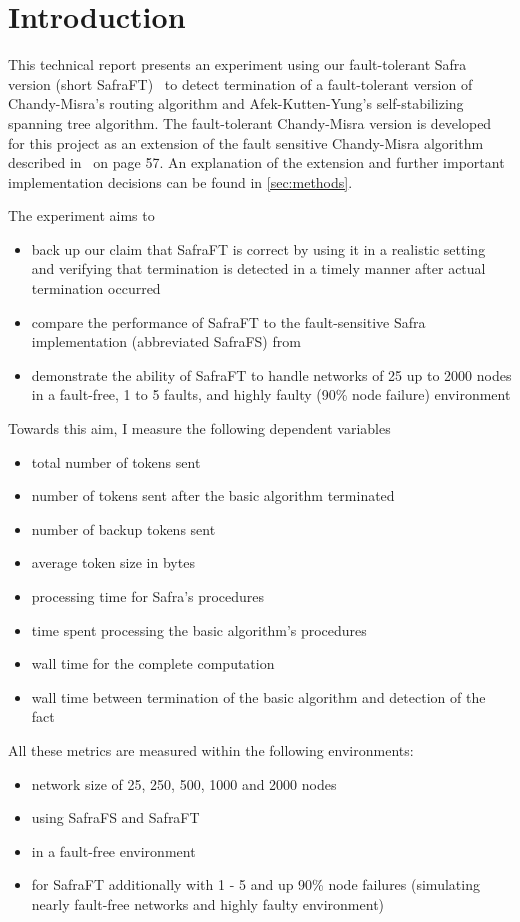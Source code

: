 \section{Introduction}
This technical report presents an experiment using our fault-tolerant Safra version (short SafraFT)~\cite{safraFT2018}
to detect termination of a fault-tolerant version of Chandy-Misra's routing algorithm and Afek-Kutten-Yung's self-stabilizing spanning tree algorithm.
The fault-tolerant Chandy-Misra version is developed for this project as an extension of the fault sensitive Chandy-Misra algorithm described in~\cite{fokkink:2018} on page 57.
An explanation of the extension and further important implementation decisions can be found in \cref{sec:methods}.

The experiment aims to
\begin{itemize}
	\item back up our claim that SafraFT is correct by using it in a realistic setting and verifying that termination is detected in a timely manner after actual termination occurred
	\item compare the performance of SafraFT to the fault-sensitive Safra implementation (abbreviated SafraFS) from \cite{demirbas2000optimal}
	\item demonstrate the ability of SafraFT to handle networks of 25 up to 2000 nodes in a fault-free, 1 to 5 faults, and highly faulty (90\% node failure) environment
\end{itemize}

Towards this aim, I measure the following dependent variables
\begin{itemize}
	\item total number of tokens sent
	\item number of tokens sent after the basic algorithm terminated
	\item number of backup tokens sent
	\item average token size in bytes
	\item processing time for Safra's procedures
	\item time spent processing the basic algorithm's procedures
	\item wall time for the complete computation
	\item wall time  between termination of the basic algorithm and detection of the fact
\end{itemize}

All these metrics are measured within the following environments:
\begin{itemize}
	\item network size of 25, 250, 500, 1000 and 2000 nodes
	\item using SafraFS and SafraFT
	\item in a fault-free environment
	\item for SafraFT additionally with 1 - 5 and up 90\% node failures (simulating nearly fault-free networks and highly faulty environment)
\end{itemize}

